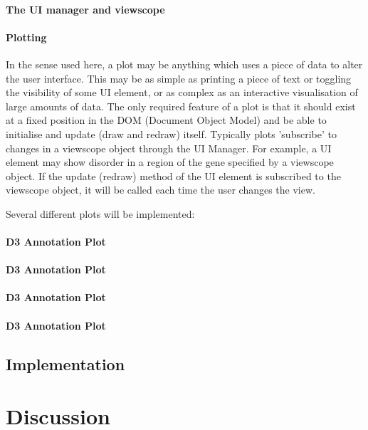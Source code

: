 \documentclass[fleqn,10pt]{article} %
\begin{document}
\paragraph{The UI manager and viewscope}

\paragraph{Plotting}

In the sense used here, a plot may be anything which uses a piece of data to alter the user interface. This may be as simple as printing a piece of text or toggling the visibility of some UI element, or as complex as an interactive visualisation of large amounts of data. The only required feature of a plot is that it should exist at a fixed position in the DOM (Document Object Model) and be able to initialise and update (draw and redraw) itself. Typically plots 'subscribe' to changes in a viewscope object through the UI Manager. For example, a UI element may show disorder in a region of the gene specified by a viewscope object. If the update (redraw) method of the UI element is subscribed to the viewscope object, it will be called each time the user changes the view.

Several different plots will be implemented:

\paragraph{D3 Annotation Plot}
\paragraph{D3 Annotation Plot}
\paragraph{D3 Annotation Plot}
\paragraph{D3 Annotation Plot}



\subsection{Implementation}



\section{Discussion}
\end{document}
